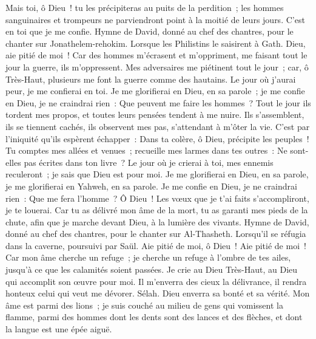 \begin{multicols}{2}
Mais toi, ô Dieu~! tu les précipiteras au puits de la perdition~; les hommes sanguinaires et trompeurs ne parviendront point à la moitié de leurs jours. C'est en toi que je me confie.
\VerseOne{}Hymne de David, donné au chef des chantres, pour le chanter sur Jonathelem-rehokim. Lorsque les Philistins le saisirent à Gath.
Dieu, aie pitié de moi~! Car des hommes m'écrasent et m'oppriment, me faisant tout le jour la guerre, ils m'oppressent.
Mes adversaires me piétinent tout le jour~; car, ô Très-Haut, plusieurs me font la guerre comme des hautains.
Le jour où j'aurai peur, je me confierai en toi.
Je me glorifierai en Dieu, en sa parole~; je me confie en Dieu, je ne craindrai rien~: Que peuvent me faire les hommes~?
Tout le jour ils tordent mes propos, et toutes leurs pensées tendent à me nuire.
Ils s'assemblent, ils se tiennent cachés, ils observent mes pas, s'attendant à m'ôter la vie.
C'est par l'iniquité qu'ils espèrent échapper~: Dans ta colère, ô Dieu, précipite les peuples~!
Tu comptes mes allées et venues~; recueille mes larmes dans tes outres~: Ne sont-elles pas écrites dans ton livre~?
Le jour où je crierai à toi, mes ennemis reculeront~; je sais que Dieu est pour moi.
Je me glorifierai en Dieu, en sa parole, je me glorifierai en Yahweh, en sa parole.
Je me confie en Dieu, je ne craindrai rien~: Que me fera l'homme~?
Ô Dieu~! Les vœux que je t'ai faits s'accompliront, je te louerai.
Car tu as délivré mon âme de la mort, tu as garanti mes pieds de la chute, afin que je marche devant Dieu, à la lumière des vivants.
\VerseOne{}Hymne de David, donné au chef des chantres, pour le chanter sur Al-Thasheth. Lorsqu'il se réfugia dans la caverne, poursuivi par Saül.
Aie pitié de moi, ô Dieu~! Aie pitié de moi~! Car mon âme cherche un refuge~; je cherche un refuge à l'ombre de tes ailes, jusqu'à ce que les calamités soient passées.
Je crie au Dieu Très-Haut, au Dieu qui accomplit son œuvre pour moi.
Il m'enverra des cieux la délivrance, il rendra honteux celui qui veut me dévorer. Sélah. Dieu enverra sa bonté et sa vérité.
Mon âme est parmi des lions~; je suis couché au milieu de gens qui vomissent la flamme, parmi des hommes dont les dents sont des lances et des flèches, et dont la langue est une épée aiguë.

\end{multicols}
